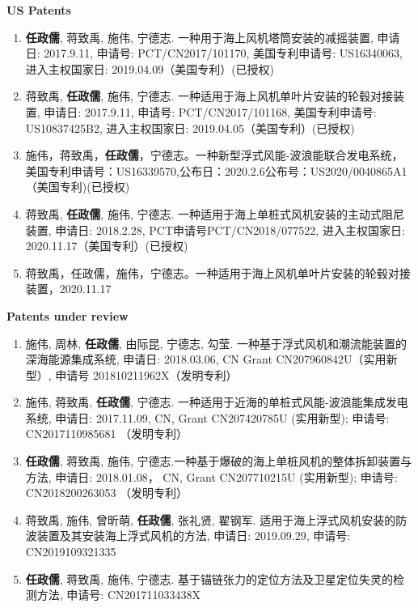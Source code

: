\documentclass[10pt]{ctexart}
\begin{document}
{    \textbf{US Patents}
    \begin{enumerate}
    \item \textbf{任政儒}, 蒋致禹, 施伟, 宁德志. 一种用于海上风机塔筒安装的减摇装置, 申请日: 2017.9.11, 申请号: PCT/CN2017/101170, 美国专利申请号: US16340063, 进入主权国家日: 2019.04.09（美国专利）(已授权) 
    \item 蒋致禹, \textbf{任政儒}, 施伟, 宁德志. 一种适用于海上风机单叶片安装的轮毂对接装置, 申请日: 2017.9.11, 申请号: PCT/CN2017/101168, 美国专利申请号: US10837425B2, 进入主权国家日: 2019.04.05（美国专利）(已授权) 
    \item 施伟，蒋致禹，\textbf{任政儒}，宁德志。一种新型浮式风能-波浪能联合发电系统，美国专利申请号：US16339570,公布日：2020.2.6公布号：US2020/0040865A1（美国专利)(已授权)
    \item 蒋致禹, \textbf{任政儒}, 施伟, 宁德志. 一种适用于海上单桩式风机安装的主动式阻尼装置, 申请日: 2018.2.28, PCT申请号PCT/CN2018/077522, 进入主权国家日: 2020.11.17（美国专利）(已授权) 
    \item 蒋致禹，任政儒，施伟，宁德志。一种适用于海上风机单叶片安装的轮毂对接装置，2020.11.17
    \end{enumerate}
    \vspace*{0.5em}
    
    \textbf{Patents under review}
    \begin{enumerate}
    \item 施伟, 周林, \textbf{任政儒}, 由际昆, 宁德志, 勾莹. 一种基于浮式风机和潮流能装置的深海能源集成系统, 申请日: 2018.03.06, CN Grant CN207960842U（实用新型）, 申请号 201810211962X（发明专利） 
    \item 施伟, 蒋致禹, \textbf{任政儒}, 宁德志. 一种适用于近海的单桩式风能-波浪能集成发电系统, 申请日: 2017.11.09, CN, Grant CN207420785U (实用新型); 申请号: CN2017110985681 （发明专利）
    \item \textbf{任政儒}, 蒋致禹, 施伟, 宁德志.一种基于爆破的海上单桩风机的整体拆卸装置与方法, 申请日: 2018.01.08， CN, Grant CN207710215U (实用新型); 申请号: CN2018200263053 （发明专利）
    \item 蒋致禹, 施伟, 曾昕萌, \textbf{任政儒}, 张礼贤, 翟钢军. 适用于海上浮式风机安装的防波装置及其安装海上浮式风机的方法, 申请日: 2019.09.29, 申请号: CN2019109321335 
    \item \textbf{任政儒}, 蒋致禹, 施伟, 宁德志. 基于锚链张力的定位方法及卫星定位失灵的检测方法, 申请号: CN201711033438X
    \end{enumerate}
    \vspace*{0.5em}
    
}
\end{document}
